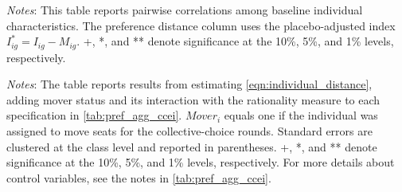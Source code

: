 \documentclass[11 pt]{article}
\begin{document}
\begin{table}[H]
\centering
\caption{Correlation Table}
\label{tab:corr_ihat}
\resizebox{\textwidth}{!}{%
}
\begin{minipage}{\textwidth}
{\footnotesize \emph{Notes}: This table reports pairwise correlations among baseline
individual characteristics. The preference distance column uses the placebo-adjusted index $I^*_{ig}=I_{ig}-M_{ig}$. +, *, and ** denote significance at the 10\%, 5\%, and
1\% levels, respectively.}
\end{minipage}
\end{table}

\begin{table}[H]
\centering
\caption{Individual Rationality and Revealed-Preference Distance by Mover Status}
\label{tab:bargaining_ccei_ihat_mover}
\begin{minipage}{\textwidth}
{\footnotesize \emph{Notes}: The table reports results from estimating \autoref{eqn:individual_distance}, adding mover status and its interaction with the rationality measure to each specification in \autoref{tab:pref_agg_ccei}. $Mover_i$ equals one if the individual was assigned to move seats for the collective-choice rounds. Standard errors are clustered at the class level and reported in parentheses. +, *, and ** denote significance at the 10\%, 5\%, and 1\% levels, respectively. For more details about control variables, see the notes in \autoref{tab:pref_agg_ccei}.}
\end{minipage}
\end{table}
\end{document}
